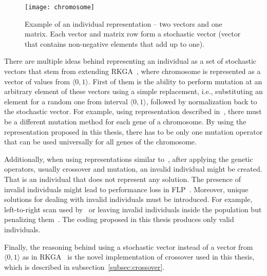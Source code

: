 \begin{figure}[htp]
    \texttt{[image: chromosome]}
    \caption[Example of an individual representation]{
        Example of an individual representation – two vectors and one matrix.
        Each vector and matrix row form a stochastic vector (vector that contains non-negative elements that add up to one).
    }
    \label{fig:chromosome}
\end{figure}

There are multiple ideas behind representing an individual as a set of stochastic vectors that stem
from extending RKGA~\cite{beanGeneticAlgorithmsRandom1994}, where chromosome is represented as a vector of values from $\langle0,1\rangle$.
First of them is the ability to perform mutation at an arbitrary element of these vectors using
a simple replacement, i.e., substituting an element for a random one from interval $\langle0,1 \rangle$,
followed by normalization back to the stochastic vector.
For example, using representation described in~\cite{friedrichIntegratedSlicingTree2018, riponAdaptiveVariableNeighborhood2013},
there must be a different mutation method for each gene of a chromosome.
By using the representation proposed in this thesis, there has to be only one mutation operator that can be used universally
for all genes of the chromosome.

Additionally, when using representations similar to~\cite{friedrichIntegratedSlicingTree2018, riponAdaptiveVariableNeighborhood2013}, after applying the genetic operators, usually crossover and mutation, an invalid individual might be created.
That is an individual that does not represent any solution.
The presence of invalid individuals might lead to performance loss in FLP~\cite{liuMultiimprovedGeneticAlgorithm2012}.
Moreover, unique solutions for dealing with invalid individuals must be introduced.
For example, left-to-right scan used by~\cite{hwangGeneticAlgorithmApproach2009, kandasamyEffectiveLocationMicro2020} or leaving invalid individuals inside the population but penalizing them~\cite{hwangGeneticAlgorithmApproach2009}.
The coding proposed in this thesis produces only valid individuals.

Finally, the reasoning behind using a stochastic vector instead of a vector from $\langle0,1\rangle$ as in RKGA~\cite{beanGeneticAlgorithmsRandom1994} is the novel implementation of crossover used in this thesis, which is described in subsection~\ref{subsec:crossover}.
